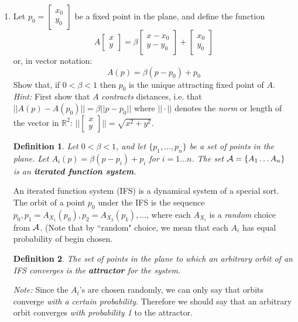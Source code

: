 \documentclass[12pt]{article}
\newtheorem{definition}{Definition}%
\begin{document}
\begin{enumerate}
\item Let $ p_0 = \left[\begin{array}{c}x_0 \\y_0 \end{array}\right] $ be a fixed point in the plane, and define the function
$$ A\left[\begin{array}{c}x \\y \end{array}\right] = \beta \left[\begin{array}{c}x - x_0 \\y - y_0 \end{array}\right] +  \left[\begin{array}{c}x_0 \\y_0 \end{array}\right] $$
or, in vector notation:  
$$ A(p) = \beta (p - p_0) + p_0$$
Show that, if $0 < \beta < 1$ then $p_0$ is the unique attracting fixed point of $A$.\\
{\it Hint: } First show that $A$ {\it contracts} distances, i.e. that $||A(p) - A(p_0)|| = \beta ||p - p_0 || $ where $|| \cdot ||$ denotes the {\it norm}
or length of the vector in ${\mathbb R}^2$: $|| \left[\begin{array}{c}x  \\y \end{array}\right] || = \sqrt{x^2 + y^2} $.
\vskip 4pt
\noindent
\begin{definition} Let $0 < \beta < 1$, and let $\{ p_1, \dots , p_n\}$ be a set of points in the plane. Let $A_i(p) = \beta(p - p_i) + p_i$ for $i = 1 \dots n$.
The set ${\cal A} = \{A_1 \dots A_n \}$ is an {\bf iterated function system}.
\end{definition}
An iterated function system (IFS)  is a dynamical system of a special sort.  The orbit of a point $p_0$ under the IFS is the sequence 
$p_0, p_1 = A_{X_1}(p_0), p_2 = A_{X_2}(p_1) , \dots $, where each $A_{X_i}$ is a {\it random} choice from ${\cal A}$.  (Note that by ``random" choice, we
mean that each $A_i$ has equal probability of begin chosen.
\begin{definition} The set of points in the plane to which an arbitrary orbit of an IFS converges is the {\bf attractor} for the system.
\end{definition}
{\it Note:}  Since the $A_i$'s are chosen randomly, we can only say that orbits converge {\it with a certain probability}.  Therefore we should say that an arbitrary orbit converges {\it with probability 1} to the attractor.

\end{enumerate}
\end{document}
